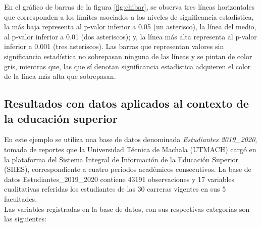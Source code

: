\documentclass[water,article,submit,moreauthors,pdftex]{mdpi}
\begin{document}
En el gráfico de barras de la figura \ref{fig:chibar}, se observa tres
líneas horizontales que corresponden a los límites asociados a los
niveles de significancia estadística, la más baja representa al p-valor
inferior a 0.05 (un asterisco), la línea del medio, al p-valor inferior
a 0.01 (dos asteriscos); y, la línea más alta representa al p-valor
inferior a 0.001 (tres asteriscos). Las barras que representan valores
sin significancia estadística no sobrepasan ninguna de las líneas y se
pintan de color gris, mientras que, las que sí denotan significancia
estadística adquieren el color de la línea más alta que sobrepasan.

\hypertarget{resultados-con-datos-aplicados-al-contexto-de-la-educaciuxf3n-superior}{%
\subsection{Resultados con datos aplicados al contexto de la educación
superior}\label{resultados-con-datos-aplicados-al-contexto-de-la-educaciuxf3n-superior}}

En este ejemplo se utiliza una base de datos denominada
\emph{Estudiantes 2019\_2020}, tomada de reportes que la Universidad
Técnica de Machala (UTMACH) cargó en la plataforma del Sistema Integral
de Información de la Educación Superior (SIIES), correspondiente a
cuatro periodos académicos consecutivos. La base de datos
Estudiantes\_2019\_2020 contiene 43191 observaciones y 17 variables
cualitativas referidas los estudiantes de las 30 carreras vigentes en
sus 5 facultades.\\
Las variables registradas en la base de datos, con sus respectivas
categorías son las siguientes:
\end{document}
